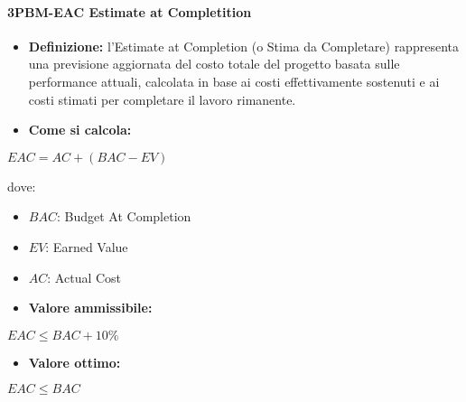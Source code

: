 \paragraph*{3PBM-EAC Estimate at Completition}
\begin{itemize}
    \item \textbf{Definizione:} l’Estimate at Completion (o Stima da Completare) rappresenta una previsione aggiornata del costo totale del progetto basata sulle performance attuali, calcolata in base ai costi effettivamente sostenuti e ai costi stimati per completare il lavoro rimanente.
    \item \textbf{Come si calcola:}
\end{itemize}
\begin{center}
   $EAC = AC + (BAC - EV)$ 
\end{center}
dove:
\begin{itemize}[label=$\rightarrow$]
    \item $BAC$: Budget At Completion
    \item $EV$: Earned Value
    \item $AC$: Actual Cost
\end{itemize}
\begin{itemize}
    \item \textbf{Valore ammissibile:}
\end{itemize}
\begin{center}
    $EAC \leq BAC + 10\%$
\end{center}
\begin{itemize}
    \item \textbf{Valore ottimo:}
\end{itemize}
\begin{center}
    $EAC \leq BAC$
\end{center}

